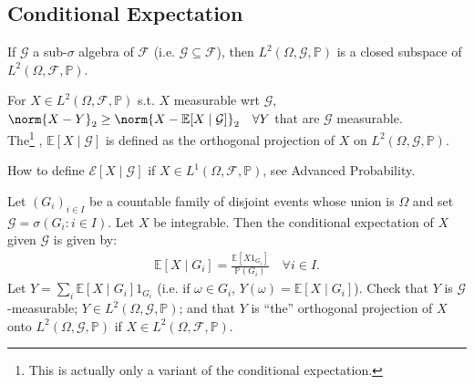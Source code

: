 \subsection{Conditional Expectation}



If $\mathcal{G}$ a sub-$\sigma$ algebra of $\mathcal{F}$ (i.e. $\mathcal{G} \subseteq \mathcal{F}$), then $L^2(\Omega, \mathcal{G}, \mathbb{P})$ is a closed subspace of $L^2(\Omega, \mathcal{F}, \mathbb{P})$.

\begin{definition}
	For $X \in L^2(\Omega, \mathcal{F}, \mathbb{P})$ s.t. $X$ measurable wrt $\mathcal{G}$, $\norm{X - Y}_2 \geq \norm{X - \mathbb{E}[X \mid \mathcal{G}]}_2 \quad \forall Y$ that are $\mathcal{G}$ measurable.\\
	The\footnote{This is actually only a variant of the conditional expectation.} , $\mathbb{E}[X \mid \mathcal{G}]$ is defined as the orthogonal projection of $X$ on $L^2(\Omega, \mathcal{G}, \mathbb{P})$.
\end{definition}

\begin{question}
	How to define $\mathcal{E}[X \mid \mathcal{G}]$ if $X \in L^1(\Omega, \mathcal{F}, \mathbb{P})$, see Advanced Probability.
\end{question}

\begin{example}
	Let $(G_i)_{i \in I}$ be a countable family of disjoint events whose union is $\Omega$ and set $\mathcal{G} = \sigma(G_i : i \in I)$.
	Let $X$ be integrable.
	Then the conditional expectation of $X$ given $\mathcal{G}$ is given by:
	\begin{align*}
		\mathbb{E}[X \mid G_i] = \frac{\mathbb{E}[X 1_{G_i}]}{\mathbb{P}(G_i)} \quad \forall i \in I.
	\end{align*}
	Let $Y = \sum_i \mathbb{E}[X \mid G_i] 1_{G_i}$ (i.e. if $\omega \in G_i$, $Y(\omega) = \mathbb{E}[X \mid G_i]$).
	Check that $Y$ is $\mathcal{G}$-measurable; $Y \in L^2(\Omega, \mathcal{G}, \mathbb{P})$; and that $Y$ is ``the'' orthogonal projection of $X$ onto $L^2(\Omega, \mathcal{G}, \mathbb{P})$ if $X \in L^2(\Omega, \mathcal{F}, \mathbb{P})$.
\end{example}

